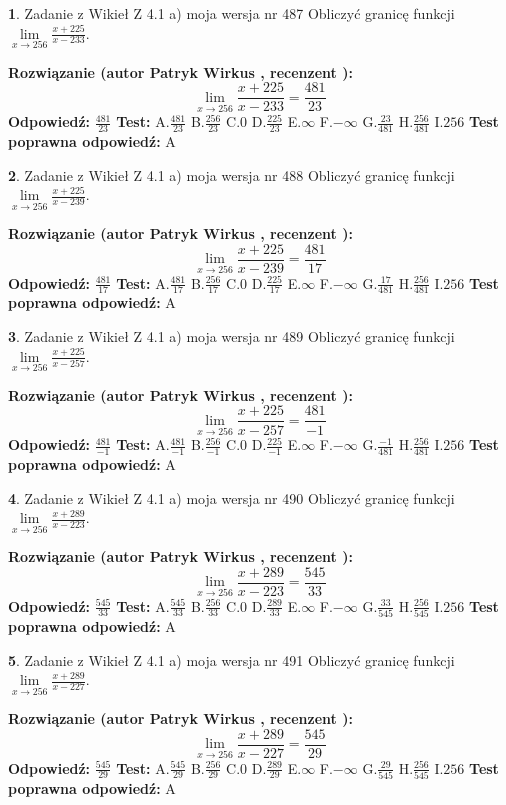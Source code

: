 \documentclass[12pt, a4paper]{article}
\theoremstyle{definition} %
\newtheorem{zad}{}
\newcommand{\zadStart}[1]{\begin{zad}#1\newline}
\newcommand{\zadStop}{\end{zad}}
\newcommand{\rozwStart}[2]{\noindent \textbf{Rozwiązanie (autor #1 , recenzent #2): }\newline}
\newcommand{\rozwStop}{\newline}
\newcommand{\odpStart}{\noindent \textbf{Odpowiedź:}\newline}
\newcommand{\odpStop}{\newline}
\newcommand{\testStart}{\noindent \textbf{Test:}\newline}
\newcommand{\testStop}{\newline}
\newcommand{\kluczStart}{\noindent \textbf{Test poprawna odpowiedź:}\newline}
\newcommand{\kluczStop}{\newline}
\begin{document}
\zadStart{Zadanie z Wikieł Z 4.1 a) moja wersja nr 487}
Obliczyć granicę funkcji $\lim\limits_{x\to256}\frac{x+225}{x-233}$.
\zadStop
\rozwStart{Patryk Wirkus}{}
$$\lim\limits_{x\to256}\frac{x+225}{x-233} = \frac{481}{23}$$
\rozwStop
\odpStart
$\frac{481}{23}$
\odpStop
\testStart
A.$\frac{481}{23}$
B.$\frac{256}{23}$
C.$0$
D.$\frac{225}{23}$
E.$\infty$
F.$-\infty$
G.$\frac{23}{481}$
H.$\frac{256}{481}$
I.$256$
\testStop
\kluczStart
A
\kluczStop



\zadStart{Zadanie z Wikieł Z 4.1 a) moja wersja nr 488}
Obliczyć granicę funkcji $\lim\limits_{x\to256}\frac{x+225}{x-239}$.
\zadStop
\rozwStart{Patryk Wirkus}{}
$$\lim\limits_{x\to256}\frac{x+225}{x-239} = \frac{481}{17}$$
\rozwStop
\odpStart
$\frac{481}{17}$
\odpStop
\testStart
A.$\frac{481}{17}$
B.$\frac{256}{17}$
C.$0$
D.$\frac{225}{17}$
E.$\infty$
F.$-\infty$
G.$\frac{17}{481}$
H.$\frac{256}{481}$
I.$256$
\testStop
\kluczStart
A
\kluczStop



\zadStart{Zadanie z Wikieł Z 4.1 a) moja wersja nr 489}
Obliczyć granicę funkcji $\lim\limits_{x\to256}\frac{x+225}{x-257}$.
\zadStop
\rozwStart{Patryk Wirkus}{}
$$\lim\limits_{x\to256}\frac{x+225}{x-257} = \frac{481}{-1}$$
\rozwStop
\odpStart
$\frac{481}{-1}$
\odpStop
\testStart
A.$\frac{481}{-1}$
B.$\frac{256}{-1}$
C.$0$
D.$\frac{225}{-1}$
E.$\infty$
F.$-\infty$
G.$\frac{-1}{481}$
H.$\frac{256}{481}$
I.$256$
\testStop
\kluczStart
A
\kluczStop



\zadStart{Zadanie z Wikieł Z 4.1 a) moja wersja nr 490}
Obliczyć granicę funkcji $\lim\limits_{x\to256}\frac{x+289}{x-223}$.
\zadStop
\rozwStart{Patryk Wirkus}{}
$$\lim\limits_{x\to256}\frac{x+289}{x-223} = \frac{545}{33}$$
\rozwStop
\odpStart
$\frac{545}{33}$
\odpStop
\testStart
A.$\frac{545}{33}$
B.$\frac{256}{33}$
C.$0$
D.$\frac{289}{33}$
E.$\infty$
F.$-\infty$
G.$\frac{33}{545}$
H.$\frac{256}{545}$
I.$256$
\testStop
\kluczStart
A
\kluczStop



\zadStart{Zadanie z Wikieł Z 4.1 a) moja wersja nr 491}
Obliczyć granicę funkcji $\lim\limits_{x\to256}\frac{x+289}{x-227}$.
\zadStop
\rozwStart{Patryk Wirkus}{}
$$\lim\limits_{x\to256}\frac{x+289}{x-227} = \frac{545}{29}$$
\rozwStop
\odpStart
$\frac{545}{29}$
\odpStop
\testStart
A.$\frac{545}{29}$
B.$\frac{256}{29}$
C.$0$
D.$\frac{289}{29}$
E.$\infty$
F.$-\infty$
G.$\frac{29}{545}$
H.$\frac{256}{545}$
I.$256$
\testStop
\kluczStart
A
\kluczStop
\end{document}
